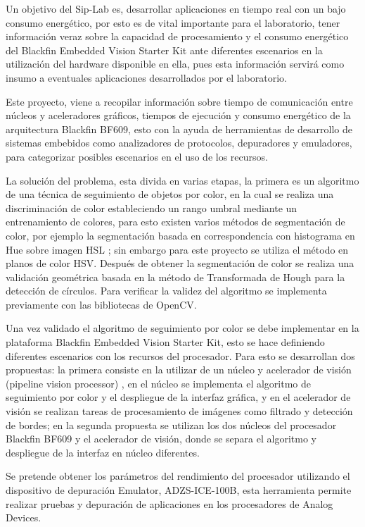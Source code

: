 Un objetivo del Sip-Lab es, desarrollar aplicaciones en tiempo real con un bajo consumo energético, por esto es de vital importante para el laboratorio, tener información veraz sobre la capacidad de procesamiento y el consumo energético del Blackfin Embedded Vision Starter Kit ante diferentes escenarios en la utilización del hardware disponible en ella, pues esta información servirá como insumo a eventuales aplicaciones desarrollados por el laboratorio.

Este proyecto, viene a recopilar información sobre tiempo de comunicación entre núcleos y aceleradores gráficos, tiempos de ejecución y consumo energético de la arquitectura Blackfin BF609, esto con la ayuda de herramientas de desarrollo de sistemas embebidos como analizadores de protocolos, depuradores y emuladores, para categorizar posibles escenarios en el uso de los recursos. 

La solución del problema, esta divida en varias etapas, la primera es un algoritmo de una técnica de seguimiento de objetos por color, en la cual se realiza una discriminación de color estableciendo un rango umbral mediante un entrenamiento de colores, para esto existen varios métodos de segmentación de color, por ejemplo la segmentación basada en correspondencia con histograma en Hue sobre imagen HSL \cite{sevilla}; sin embargo para este proyecto se utiliza el método en planos de color HSV. Después de obtener la segmentación de color se realiza una validación geométrica basada en la método de Transformada de Hough para la detección de círculos. Para verificar la validez del algoritmo se implementa previamente con las bibliotecas de OpenCV\cite{opencv2014}.

Una vez validado el algoritmo de seguimiento por color se debe implementar en la plataforma Blackfin Embedded Vision Starter Kit, esto se hace definiendo diferentes escenarios con los recursos del procesador. Para esto se desarrollan dos propuestas: la primera consiste en la utilizar de un núcleo y acelerador de visión (pipeline vision processor) \cite{blackfin2014}, en el núcleo se implementa el algoritmo de seguimiento por color y el despliegue de la interfaz gráfica, y en el acelerador de visión se realizan tareas de procesamiento de imágenes como filtrado y detección de bordes; en la segunda propuesta se utilizan los dos núcleos del procesador Blackfin BF609 \cite{blackfin2014} y el acelerador de visión, donde se separa el algoritmo y despliegue de la interfaz en núcleo diferentes.  

Se pretende obtener los parámetros del rendimiento del procesador utilizando el dispositivo de depuración Emulator, ADZS-ICE-100B\cite{ice100}, esta herramienta permite realizar pruebas y depuración de aplicaciones en los procesadores de Analog Devices.   
\\
\\
\\

